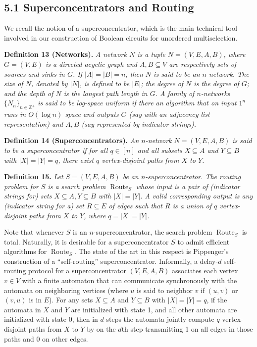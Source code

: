 \documentclass[10pt,a4paper]{article}
\newcommand{\ZZ}{\mathbb Z}
\newenvironment{originalresult}[1]{\par\medskip\noindent\textbf{#1.}\itshape}{\par\medskip}
\begin{document}
\subsection*{5.1 Superconcentrators and Routing}
We recall the notion of a superconcentrator, which is the main technical tool involved in our construction of Boolean circuits for unordered multiselection.
\begin{originalresult}{Definition 13 (Networks)}
A network $N$ is a tuple $N=(V,E,A,B)$, where $G=(V,E)$ is a directed acyclic graph and $A,B\subseteq V$ are respectively sets of sources and sinks in $G$.
If $|A|=|B|=n$, then $N$ is said to be an $n$-network. The size of $N$, denoted by $|N|$, is defined to be $|E|$; the degree of $N$ is the degree of $G$; and the depth of $N$ is the longest path length in $G$.
A family of $n$-networks $\{N_n\}_{n\in\ZZ^+}$ is said to be log-space uniform if there an algorithm that on input $1^n$ runs in $O(\log n)$ space and outputs $G$ (say with an adjacency list representation) and $A,B$ (say represented by indicator strings).
\end{originalresult}
\begin{originalresult}{Definition 14 (Superconcentrators)}
An $n$-network $N=(V,E,A,B)$ is said to be a superconcentrator if for all $q\in[n]$ and all subsets $X\subseteq A$ and $Y\subseteq B$ with $|X|=|Y|=q$, there exist $q$ vertex-disjoint paths from $X$ to $Y$.
\end{originalresult}
\begin{originalresult}{Definition 15}
Let $S=(V,E,A,B)$ be an $n$-superconcentrator. The routing problem for $S$ is a search problem $\operatorname{Route}_S$ whose input is a pair of (indicator strings for) sets $X\subseteq A,Y\subseteq B$ with $|X|=|Y|$. A valid corresponding output is any (indicator string for a) set $R\subseteq E$ of edges such that $R$ is a union of $q$ vertex-disjoint paths from $X$ to $Y$, where $q=|X|=|Y|$.
\end{originalresult}
Note that whenever $S$ is an $n$-superconcentrator, the search problem $\operatorname{Route}_S$ is total. Naturally, it is desirable for a superconcentrator $S$ to admit efficient algorithms for $\operatorname{Route}_S$. The state of the art in this respect is Pippenger's construction of a ``self-routing'' superconcentrator.
Informally, a delay-$d$ self-routing protocol for a superconcentrator $(V,E,A,B)$ associates each vertex $v\in V$ with a finite automaton that can communicate synchronously with the automata on neighboring vertices (where $u$ is said to neighbor $v$ if $(u,v)$ or $(v,u)$ is in $E$). For any sets $X\subseteq A$ and $Y\subseteq B$ with $|X|=|Y|=q$, if the automata in $X$ and $Y$ are initialized with state 1, and all other automata are initialized with state 0, then in $d$ steps the automata jointly compute $q$ vertex-disjoint paths from $X$ to $Y$ by on the $d$th step transmitting 1 on all edges in those paths and 0 on other edges.
\end{document}
